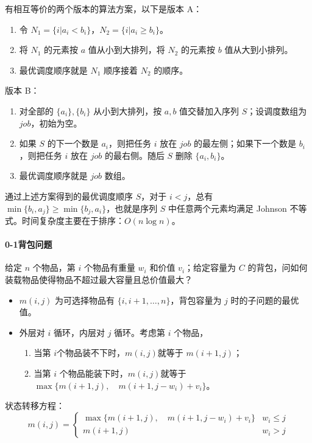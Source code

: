 \documentclass[UTF8]{ctexart}
\newcommand\Emph[1]{\textcolor{cyan!80!black}{#1}}
\begin{document}
有相互等价的两个版本的算法方案，以下是版本 A：
\begin{enumerate}[itemsep=0pt,parsep=0pt]
  \item 令 $N_1 = \{i|a_i<b_i\}$，$N_2 = \{i|a_i\geqslant b_i\}$。
  \item 将 $N_1$ 的元素按 $a$ 值从小到大排列，将 $N_2$ 的元素按 $b$ 值从大到小排列。
  \item 最优调度顺序就是 $N_1$ 顺序接着 $N_2$ 的顺序。
\end{enumerate}

版本 B：
\begin{enumerate}[itemsep=0pt,parsep=0pt]
  \item 对全部的 $\{a_i\},\{b_i\}$ 从小到大排列，按 $a,b$ 值交替加入序列 $S$；设调度数组为 $job$，初始为空。
  \item 如果 $S$ 的下一个数是 $a_i$，则把任务 $i$ 放在 $job$ 的最左侧；如果下一个数是 $b_i$，则把任务 $i$ 放在 $job$ 的最右侧。随后 $S$ 删除 $\{a_i,b_i\}$。
  \item 最优调度顺序就是 $job$ 数组。
\end{enumerate}

通过上述方案得到的最优调度顺序 $S$，对于 $i<j$，总有 $\min\{b_i,a_j\}\geqslant \min\{b_j,a_i\}$，也就是序列 $S$ 中任意两个元素均满足 Johnson 不等式。\Emph{时间复杂度主要在于排序：$O(n\log n)$。}

\paragraph{0-1背包问题} 给定 $n$ 个物品，第 $i$ 个物品有重量 $w_i$ 和价值 $v_i$；给定容量为 $C$ 的背包，问如何装载物品使得物品不超过最大容量且总价值最大？

\begin{itemize}
  \item $m(i,j)$ 为可选择物品有 $\{i,i+1,\dots,n\}$，背包容量为 $j$ 时的子问题的最优值。
  \item 外层对 $i$ 循环，内层对 $j$ 循环。考虑第 $i$ 个物品，
  \begin{enumerate}[itemsep=0pt,parsep=0pt]
    \item 当第 $i$个物品装不下时，$m(i,j)$就等于 $m(i+1,j)$；
    \item 当第 $i$ 个物品能装下时，$m(i,j)$就等于 $\max\{m(i+1, j),\quad m(i+1, j-w_i)+v_i \}$。
  \end{enumerate}
\end{itemize}

状态转移方程：
\begin{equation*}
    m(i,j) = \begin{cases} 
    \max\{m(i+1, j),\quad m(i+1, j-w_i)+v_i \} &w_i\leqslant j \\ m(i+1,j) & w_i > j
    \end{cases}
\end{equation*}
\end{document}
